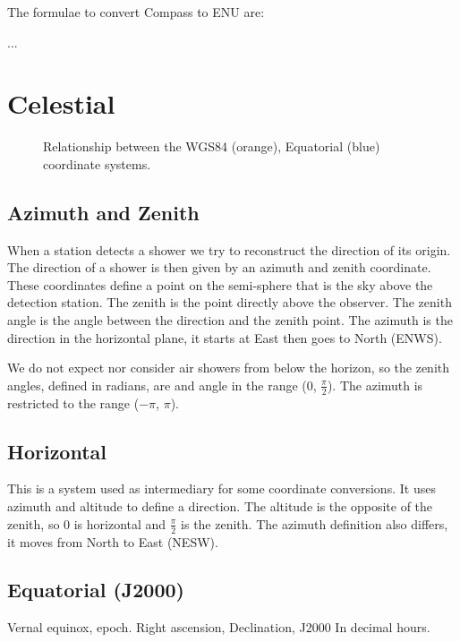The formulae to convert Compass to ENU are:

...


\section{Celestial}


\begin{figure}
    \centering
    
    \caption{Relationship between the WGS84 (orange), Equatorial (blue)
             coordinate systems.}
    \label{fig:wgs84_ecef_enu}
\end{figure}


\subsection{Azimuth and Zenith}

When a station detects a shower we try to reconstruct the direction of
its origin. The direction of a shower is then given by an azimuth and
zenith coordinate. These coordinates define a point on the semi-sphere
that is the sky above the detection station. The zenith is the point
directly above the observer. The zenith angle is the angle between the
direction and the zenith point. The azimuth is the direction in the
horizontal plane, it starts at East then goes to North (ENWS).

We do not expect nor consider air showers from below the horizon, so the
zenith angles, defined in radians, are and angle in the range (0,
$\frac{\pi}{2}$). The azimuth is restricted to the range ($-\pi$, $\pi$).


\subsection{Horizontal}

This is a system used as intermediary for some coordinate conversions.
It uses azimuth and altitude to define a direction. The altitude is the
opposite of the zenith, so 0 is horizontal and $\frac{\pi}{2}$ is the
zenith. The azimuth definition also differs, it moves from North to East
(NESW).


\subsection{Equatorial (J2000)}

Vernal equinox, epoch.
Right ascension, Declination, J2000
In decimal hours.


